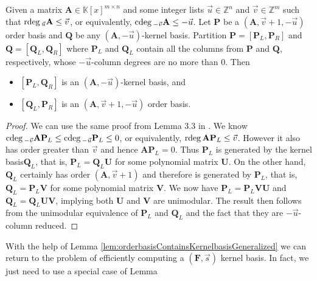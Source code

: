 \begin{lem}
\label{lem:orderbasisContainsKernelbasisGeneralized} Given a matrix
$\mathbf{A}\in\mathbb{K}\left[x\right]^{m\times n}$ and some integer
lists $\vec{u}\in\mathbb{Z}^{n}$ and $\vec{v}\in\mathbb{Z}^{m}$
such that ${\rm rdeg}\,_{\vec{u}}\mathbf{A}\le\vec{v}$, or equivalently,
${\rm cdeg}\,_{-\vec{v}}\mathbf{A}\le-\vec{u}$. Let $\mathbf{P}$ be a $\left(\mathbf{A},\vec{v}+1,-\vec{u}\right)$
order basis and $\mathbf{Q}$ be any $(\mathbf{A},-\vec{u})$-kernel
basis. Partition $\mathbf{P}=\left[\mathbf{P}_{L},\mathbf{P}_{R}\right]$
and $\mathbf{Q}=\left[\mathbf{Q}_{L},\mathbf{Q}_{R}\right]$ where
$\mathbf{P}_{L}$ and $\mathbf{Q}_{L}$ contain all the columns from
$\mathbf{P}$ and $\mathbf{Q}$, respectively, whose $-\vec{u}$-column
degrees are no more than $0$. Then 
\begin{itemize}
\item $\left[\mathbf{P}_{L},\mathbf{Q}_{R}\right]$ is an $(\mathbf{A},-\vec{u})$-kernel
basis, and 
\item $\left[\mathbf{Q}_{L},\mathbf{P}_{R}\right]$ is an $\left(\mathbf{A},\vec{v}+1,-\vec{u}\right)$
order basis. 
\end{itemize}
\end{lem}
\begin{proof}
We can use the same proof from Lemma 3.3 in \cite{za2012}. We know
${\rm cdeg}\,_{-\vec{v}}\mathbf{A}\mathbf{P}_{L}\le{\rm cdeg}\,_{-\vec{u}}\mathbf{P}_{L}\le0$,
or equivalently, ${\rm rdeg}\,\mathbf{A}\mathbf{P}_{L}\le\vec{v}$. However
it also has order greater than $\vec{v}$ and hence $\mathbf{A}\mathbf{P}_{L}=0$.
Thus $\mathbf{P}_{L}$ is generated by the kernel basis$\mathbf{Q}_{L}$,
that is, $\mathbf{P}_{L}=\mathbf{Q}_{L}\mathbf{U}$ for some polynomial
matrix $\mathbf{U}$. On the other hand, $\mathbf{Q}_{L}$ certainly
has order $\left(\mathbf{A},\vec{v}+1\right)$ and therefore is generated
by $\mathbf{P}_{L}$, that is, $\mathbf{Q}_{L}=\mathbf{P}_{L}\mathbf{V}$
for some polynomial matrix $\mathbf{V}$. We now have $\mathbf{P}_{L}=\mathbf{P}_{L}\mathbf{V}\mathbf{U}$
and $\mathbf{Q}_{L}=\mathbf{Q}_{L}\mathbf{U}\mathbf{V}$, implying
both $\mathbf{U}$ and $\mathbf{V}$ are unimodular. The result then
follows from the unimodular equivalence of $\mathbf{P}_{L}$ and $\mathbf{Q}_{L}$
and the fact that they are $-\vec{u}$-column reduced.
\end{proof}
With the help of Lemma \ref{lem:orderbasisContainsKernelbasisGeneralized}
we can return to the problem of efficiently computing a $(\mathbf{F},\vec{s})$
kernel basis. In fact, we just need to use a special case of Lemma

